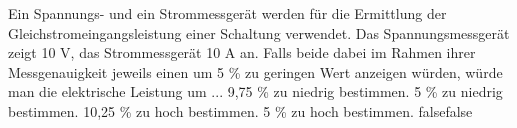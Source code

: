     {Ein Spannungs- und ein Strommessgerät werden für die Ermittlung der Gleichstromeingangsleistung einer Schaltung verwendet. Das Spannungsmessgerät zeigt 10 V, das Strommessgerät 10 A an. Falls beide dabei im Rahmen ihrer Messgenauigkeit jeweils einen um 5 \% zu geringen Wert anzeigen würden, würde man die elektrische Leistung um ...}
    {9,75 \% zu niedrig bestimmen.}
    {5 \% zu niedrig bestimmen.}
    {10,25 \% zu hoch bestimmen.}
    {5 \% zu hoch bestimmen.}
    {false}{false}
